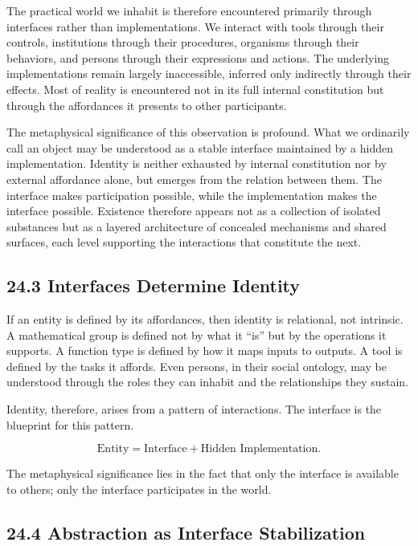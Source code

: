 \documentclass[12pt,letterpaper]{article}
\theoremstyle{remark}
\begin{document}
The practical world we inhabit is therefore encountered primarily through interfaces rather than implementations. We interact with tools through their controls, institutions through their procedures, organisms through their behaviors, and persons through their expressions and actions. The underlying implementations remain largely inaccessible, inferred only indirectly through their effects. Most of reality is encountered not in its full internal constitution but through the affordances it presents to other participants.

The metaphysical significance of this observation is profound. What we ordinarily call an object may be understood as a stable interface maintained by a hidden implementation. Identity is neither exhausted by internal constitution nor by external affordance alone, but emerges from the relation between them. The interface makes participation possible, while the implementation makes the interface possible. Existence therefore appears not as a collection of isolated substances but as a layered architecture of concealed mechanisms and shared surfaces, each level supporting the interactions that constitute the next.

\subsection{24.3 Interfaces Determine Identity}

If an entity is defined by its affordances, then identity is relational, not intrinsic. A mathematical group is defined not by what it ``is'' but by the operations it supports. A function type is defined by how it maps inputs to outputs. A tool is defined by the tasks it affords. Even persons, in their social ontology, may be understood through the roles they can inhabit and the relationships they sustain.

Identity, therefore, arises from a pattern of interactions. The interface is the blueprint for this pattern.

\[
\text{Entity} = \text{Interface} + \text{Hidden Implementation}.
\]

The metaphysical significance lies in the fact that only the interface is available to others; only the interface participates in the world.

\subsection{24.4 Abstraction as Interface Stabilization}
\end{document}
